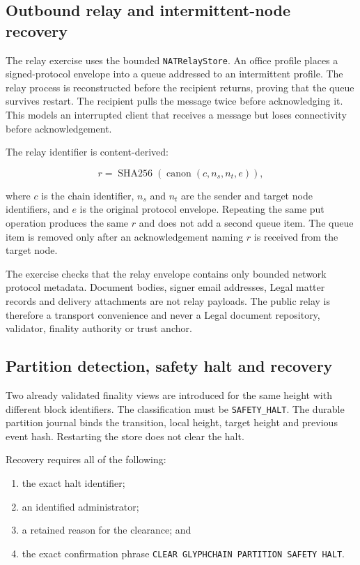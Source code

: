 \subsection{Outbound relay and intermittent-node recovery}

The relay exercise uses the bounded \texttt{NATRelayStore}.  An office profile
places a signed-protocol envelope into a queue addressed to an intermittent
profile.  The relay process is reconstructed before the recipient returns,
proving that the queue survives restart.  The recipient pulls the message twice
before acknowledging it.  This models an interrupted client that receives a
message but loses connectivity before acknowledgement.

The relay identifier is content-derived:

\begin{equation}
  r = \operatorname{SHA256}\!\left(
    \operatorname{canon}(c, n_s, n_t, e)
  \right),
\end{equation}

where $c$ is the chain identifier, $n_s$ and $n_t$ are the sender and target
node identifiers, and $e$ is the original protocol envelope.  Repeating the
same put operation produces the same $r$ and does not add a second queue item.
The queue item is removed only after an acknowledgement naming $r$ is received
from the target node.

The exercise checks that the relay envelope contains only bounded network
protocol metadata.  Document bodies, signer email addresses, Legal matter
records and delivery attachments are not relay payloads.  The public relay is
therefore a transport convenience and never a Legal document repository,
validator, finality authority or trust anchor.

\subsection{Partition detection, safety halt and recovery}

Two already validated finality views are introduced for the same height with
different block identifiers.  The classification must be
\texttt{SAFETY\_HALT}.  The durable partition journal binds the transition,
local height, target height and previous event hash.  Restarting the store does
not clear the halt.

Recovery requires all of the following:

\begin{enumerate}
  \item the exact halt identifier;
  \item an identified administrator;
  \item a retained reason for the clearance; and
  \item the exact confirmation phrase
  \texttt{CLEAR GLYPHCHAIN PARTITION SAFETY HALT}.
\end{enumerate}

